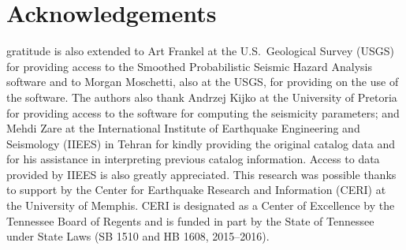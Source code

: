 \section{Acknowledgements}

 gratitude is also extended to Art Fran\-kel at the U.S.~Geological Survey (USGS) for providing access to the Smoothed Probabilistic Seismic Hazard Analysis software and to Morgan Moschetti, also at the USGS, for providing  on the use of the software. The authors also thank Andrzej Kijko at the University of Pretoria for providing access to the software for computing the seismicity parameters; and Mehdi Zare at the International Institute of Earthquake Engineering and Seismology (IIEES) in Tehran for kindly providing the original catalog data and for his assistance in interpreting previous catalog information. Access to data provided by IIEES is also greatly appreciated. This research was possible thanks to support by the Center for Earthquake Research and Information (CERI) at the University of Memphis. CERI is designated as a Center of Excellence by the Tennessee Board of Regents and is funded in part by the State of Tennessee under State  Laws (SB 1510 and HB 1608, 2015--2016).
